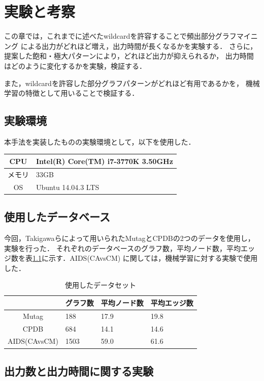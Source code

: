 
\chapter{実験と考察}

この章では，これまでに述べたwildcardを許容することで頻出部分グラフマイニング
による出力がどれほど増え，出力時間が長くなるかを実験する．
さらに，提案した飽和・極大パターンにより，どれほど出力が抑えられるか，
出力時間はどのように変化するかを実験，検証する．

また，wildcardを許容した部分グラフパターンがどれほど有用であるかを，
機械学習の特徴として用いることで検証する．

\section{実験環境}
本手法を実装したものの実験環境として，以下を使用した．

\begin{center}
\begin{tabular}{cl}
\hline
CPU& Intel(R) Core(TM) i7-3770K 3.50GHz\\
\hline
メモリ&33GB\\
\hline
OS &Ubuntu 14.04.3 LTS\\
\hline
\end{tabular}
\end{center}

\section{使用したデータベース}
今回，Takigawaら\cite{deltol}によって用いられたMutagとCPDBの2つのデータを使用し，実験を行った．
それぞれのデータベースのグラフ数，平均ノード数，平均エッジ数を表\ref{dataset}に示す．AIDS(CAvsCM)
に関しては，機械学習に対する実験で使用した．
\begin{table}[h]
\caption{使用したデータセット}
\begin{center}
\begin{tabular}{|c|l|l|l|}
\hline
 &グラフ数&平均ノード数&平均エッジ数\\
\hline
Mutag &188&17.9&19.8\\
\hline
CPDB&684&14.1&14.6\\
\hline
AIDS(CAvsCM)&1503&59.0&61.6\\
\hline
\end{tabular}
\end{center}
\label{dataset}
\end{table}
\section{出力数と出力時間に関する実験}
\label{out-exp}

